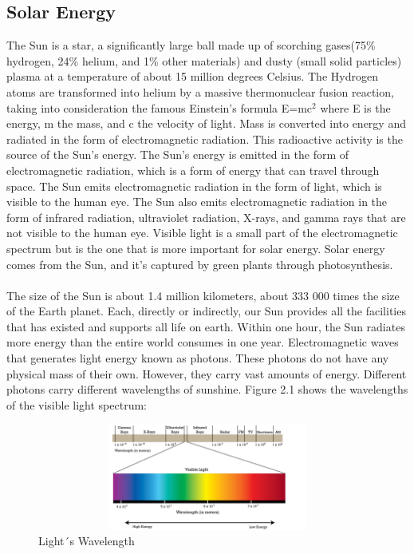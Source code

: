 \documentclass{report}
\begin{document}
\subsection{Solar Energy}
The Sun is a star, a significantly large ball made up of scorching gases(75\% hydrogen, 24\% helium, and 1\% other materials) and dusty (small solid particles) plasma at a temperature of about 15 million degrees Celsius. The Hydrogen atoms are transformed into helium by a massive thermonuclear fusion reaction, taking into consideration the famous Einstein's formula E=mc$^2$ where E is the energy, m the mass, and c the velocity of light. Mass is converted into energy and radiated in the form of electromagnetic radiation. 
This radioactive activity is the source of the Sun's energy. The Sun's energy is emitted in the form of electromagnetic radiation, which is a form of energy that can travel through space. The Sun emits electromagnetic radiation in the form of light, which is visible to the human eye. The Sun also emits electromagnetic radiation in the form of infrared radiation, ultraviolet radiation, X-rays, and gamma rays that are not visible to the human eye. Visible light is a small part of the electromagnetic spectrum but is the one that is more important for solar energy. Solar energy comes from the Sun, and it's captured by green plants through photosynthesis.\\
\\
The size of the Sun is about 1.4 million kilometers, about 333 000 times the size of the Earth planet. Each, directly or indirectly, our Sun provides all the facilities that has existed and supports all life on earth. Within one hour, the Sun radiates more energy than the entire world consumes in one year.  Electromagnetic waves that generates light energy known as photons. These photons do not have any physical mass of their own. However, they carry vast amounts of energy. Different photons carry different wavelengths of sunshine. Figure 2.1 shows the wavelengths of the visible light spectrum\cite{MLPV}:
\\
\begin{figure}[h!]
    \centering
    \includegraphics[width=12cm, height=3.5cm] {light.png}
    \caption{Light´s Wavelength\cite{fig1}}
    \label{fig:my_label}
\end{figure}
\end{document}
